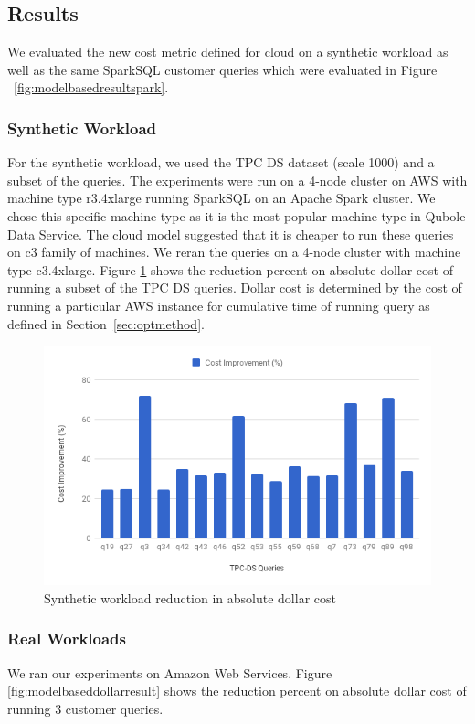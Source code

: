 \subsection{Results}

We evaluated the new cost metric defined for cloud on a synthetic workload as well as the same SparkSQL customer queries which were evaluated in Figure ~\ref{fig:modelbasedresultspark}. 

\subsubsection*{Synthetic Workload}
For the synthetic workload, we used the TPC DS dataset (scale 1000) and a subset of the queries. The experiments
were run on a 4-node cluster on AWS with machine type r3.4xlarge running SparkSQL on an Apache Spark cluster. We chose this specific machine type as it is the 
most popular machine type in Qubole Data Service. The cloud model suggested that it is cheaper to run these 
queries on c3 family of machines. We reran the queries on a 4-node cluster with machine type c3.4xlarge. 
Figure \ref{fig:syntheticcloudmodel} shows the reduction percent on absolute dollar cost of running a subset of the
TPC DS queries. Dollar cost is determined by the cost of running a particular AWS instance for cumulative time of running query as defined in Section~\ref{sec:optmethod}.
\begin{figure}[h]
	\includegraphics[width=\linewidth]{CloudSyn.png}
	\caption{Synthetic workload reduction in absolute dollar cost}
	\label{fig:syntheticcloudmodel}
\end{figure}

\subsubsection*{Real Workloads}
We ran our experiments on Amazon Web Services. Figure \ref{fig:modelbaseddollarresult} shows the reduction percent on absolute dollar cost of running 3 customer queries. 

